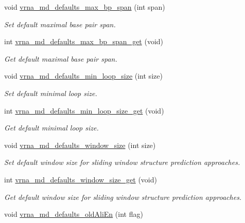 \begin{DoxyCompactItemize}
void \hyperlink{group__model__details_ga4c4bc962f09b4480cb8499f1cf8ae4ec}{vrna\+\_\+md\+\_\+defaults\+\_\+max\+\_\+bp\+\_\+span} (int span)
\begin{DoxyCompactList}\small\item\em Set default maximal base pair span. \end{DoxyCompactList}\item 
int \hyperlink{group__model__details_gaa60f989e062fecd4d4bac89c1883da85}{vrna\+\_\+md\+\_\+defaults\+\_\+max\+\_\+bp\+\_\+span\+\_\+get} (void)
\begin{DoxyCompactList}\small\item\em Get default maximal base pair span. \end{DoxyCompactList}\item 
void \hyperlink{group__model__details_gac152f1e78c1058a10261022c8dfda0f7}{vrna\+\_\+md\+\_\+defaults\+\_\+min\+\_\+loop\+\_\+size} (int size)
\begin{DoxyCompactList}\small\item\em Set default minimal loop size. \end{DoxyCompactList}\item 
int \hyperlink{group__model__details_ga5cc691174a75c652807dc361b617632a}{vrna\+\_\+md\+\_\+defaults\+\_\+min\+\_\+loop\+\_\+size\+\_\+get} (void)
\begin{DoxyCompactList}\small\item\em Get default minimal loop size. \end{DoxyCompactList}\item 
void \hyperlink{group__model__details_ga7b802ce0e8c3181bf5cb580de6d5b26a}{vrna\+\_\+md\+\_\+defaults\+\_\+window\+\_\+size} (int size)
\begin{DoxyCompactList}\small\item\em Set default window size for sliding window structure prediction approaches. \end{DoxyCompactList}\item 
int \hyperlink{group__model__details_ga670146a9aa3ba77f4d422d60b7c30ac9}{vrna\+\_\+md\+\_\+defaults\+\_\+window\+\_\+size\+\_\+get} (void)
\begin{DoxyCompactList}\small\item\em Get default window size for sliding window structure prediction approaches. \end{DoxyCompactList}\item 
void \hyperlink{group__model__details_ga41521d5b9fb7e0f31e7ea73f5792afab}{vrna\+\_\+md\+\_\+defaults\+\_\+old\+Ali\+En} (int flag)

\end{DoxyCompactItemize}
